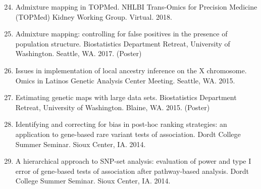 \documentclass[margin]{res}
\newenvironment{benumerate}[1]{
    \let\oldItem\item
    \def\item{\addtocounter{enumi}{-2}\oldItem}
    
    \begin{enumerate}
    \setcounter{enumi}{#1}
    \addtocounter{enumi}{1}
}{
    \end{enumerate}
}
\begin{document}
\begin{resume}
\begin{benumerate}{23}
\item Admixture mapping in TOPMed. NHLBI Trans-Omics for Precision Medicine (TOPMed) Kidney Working Group. Virtual. 2018.  


\item %
Admixture mapping: controlling for false positives in the presence of population structure. Biostatistics Department Retreat, University of Washington. Seattle, WA. 2017. (Poster)



\item %
Issues in implementation of local ancestry inference on the X chromosome. Omics in Latinos Genetic Analysis Center Meeting. Seattle, WA. 2015.

\item %
Estimating genetic maps with large data sets. Biostatistics Department Retreat, University of Washington. Blaine, WA. 2015. (Poster)


\item %
Identifying and correcting for bias in post-hoc ranking strategies: an application to gene-based rare variant tests of association. Dordt College Summer Seminar. Sioux Center, IA. 2014.

\item %
A hierarchical approach to SNP-set analysis: evaluation of power and type I error of gene-based tests of association after pathway-based analysis. Dordt College Summer Seminar. Sioux Center, IA. 2014.


\end{benumerate}
\end{resume}
\end{document}
